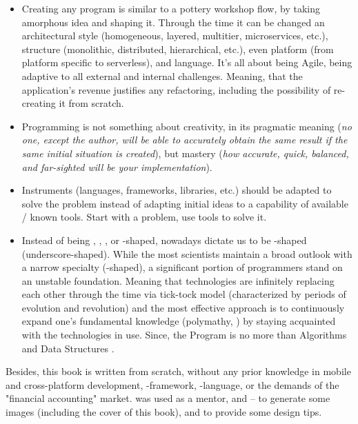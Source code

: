 \begin{itemize}
\setlength{\itemsep}{3pt}
\setlength{\parskip}{0pt}
\setlength{\parsep}{0pt}
    \item Creating any program is similar to a pottery workshop flow, by taking amorphous idea and shaping it. Through 
    the time it can be changed an architectural style (homogeneous, layered, multitier, microservices, etc.), structure 
    (monolithic, distributed, hierarchical, etc.), even platform (from platform specific to serverless), and language. 
    It's all about being Agile, being adaptive to all external and internal challenges. Meaning, that the application's 
    revenue justifies any refactoring, including the possibility of re-creating it from scratch.

    \item Programming is not something about creativity, in its pragmatic meaning (\emph{no one, except the author, 
    will be able to accurately obtain the same result if the same initial situation is created}), but mastery 
    (\emph{how accurate, quick, balanced, and far-sighted will be your implementation}).

    \item Instruments (languages, frameworks, libraries, etc.) should be adapted to solve the problem instead of 
    adapting initial ideas to a capability of available / known tools. Start with a problem, use tools to solve it.

    \item Instead of being , , , or -shaped, nowadays dictate us to be \q{\_}-shaped 
    (underscore-shaped). While the most scientists maintain a broad outlook with a narrow specialty (-shaped), a 
    significant portion of programmers stand on an unstable foundation. Meaning that technologies are infinitely 
    replacing each other through the time via tick-tock model (characterized by periods of evolution and revolution) 
    and the most effective approach is to continuously expand one's fundamental knowledge (polymathy, \cite{Root09}) 
    by staying acquainted with the technologies in use. Since, the Program is no more than Algorithms and Data 
    Structures \cite{Wirt76}.
\end{itemize}

\noindent Besides, this book is written from scratch, without any prior knowledge in mobile and cross-platform 
development, -framework, -language, or the demands of the "financial accounting" market. 
 was used as a mentor, and  -- to generate some images (including the cover of this 
book), and to provide some design tips.

